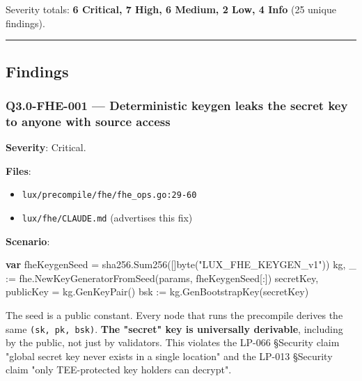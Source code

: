 \documentclass[
]{article}
\newenvironment{Shaded}{}{}
\newcommand{\DataTypeTok}[1]{\textcolor[rgb]{0.56,0.13,0.00}{#1}}
\newcommand{\KeywordTok}[1]{\textcolor[rgb]{0.00,0.44,0.13}{\textbf{#1}}}
\newcommand{\NormalTok}[1]{#1}
\newcommand{\OperatorTok}[1]{\textcolor[rgb]{0.40,0.40,0.40}{#1}}
\newcommand{\StringTok}[1]{\textcolor[rgb]{0.25,0.44,0.63}{#1}}
\providecommand{\tightlist}{%
  \setlength{\itemsep}{0pt}\setlength{\parskip}{0pt}}
\begin{document}
Severity totals: \textbf{6 Critical, 7 High, 6 Medium, 2 Low, 4 Info}
(25 unique findings).

\begin{center}\rule{0.5\linewidth}{0.5pt}\end{center}

\subsection{Findings}\label{findings}

\subsubsection{Q3.0-FHE-001 --- Deterministic keygen leaks the secret
key to anyone with source
access}\label{q30-fhe-001--deterministic-keygen-leaks-the-secret-key-to-anyone-with-source-access}

\textbf{Severity}: Critical.

\textbf{Files}:

\begin{itemize}
\tightlist
\item
  \texttt{lux/precompile/fhe/fhe\_ops.go:29-60}
\item
  \texttt{lux/fhe/CLAUDE.md} (advertises this fix)
\end{itemize}

\textbf{Scenario}:

\begin{Shaded}
\begin{Highlighting}[]
\KeywordTok{var}\NormalTok{ fheKeygenSeed }\OperatorTok{=}\NormalTok{ sha256}\OperatorTok{.}\NormalTok{Sum256}\OperatorTok{([]}\DataTypeTok{byte}\OperatorTok{(}\StringTok{"LUX\_FHE\_KEYGEN\_v1"}\OperatorTok{))}
\NormalTok{kg}\OperatorTok{,}\NormalTok{ \_ }\OperatorTok{:=}\NormalTok{ fhe}\OperatorTok{.}\NormalTok{NewKeyGeneratorFromSeed}\OperatorTok{(}\NormalTok{params}\OperatorTok{,}\NormalTok{ fheKeygenSeed}\OperatorTok{[:])}
\NormalTok{secretKey}\OperatorTok{,}\NormalTok{ publicKey }\OperatorTok{=}\NormalTok{ kg}\OperatorTok{.}\NormalTok{GenKeyPair}\OperatorTok{()}
\NormalTok{bsk }\OperatorTok{:=}\NormalTok{ kg}\OperatorTok{.}\NormalTok{GenBootstrapKey}\OperatorTok{(}\NormalTok{secretKey}\OperatorTok{)}
\end{Highlighting}
\end{Shaded}

The seed is a public constant. Every node that runs the precompile
derives the same \texttt{(sk,\ pk,\ bsk)}. \textbf{The "secret" key is
universally derivable}, including by the public, not just by validators.
This violates the LP-066 §Security claim "global secret key never exists
in a single location" and the LP-013 §Security claim "only TEE-protected
key holders can decrypt".
\end{document}
